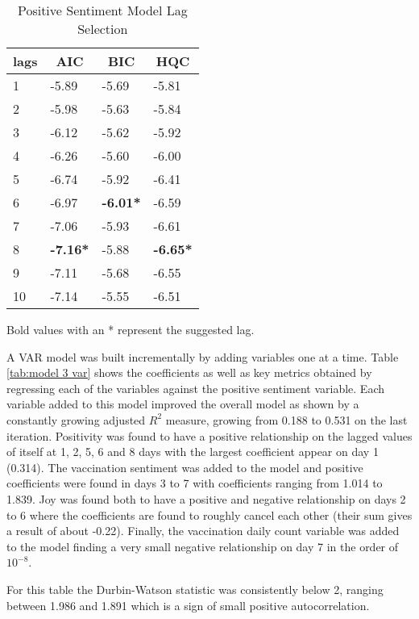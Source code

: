 \begin{table}[H]
\centering
\begin{tabular}{@{}llll@{}}
\toprule
\multicolumn{1}{c}{\textbf{lags}} & \multicolumn{1}{c}{\textbf{AIC}} & \multicolumn{1}{c}{\textbf{BIC}} & \multicolumn{1}{c}{\textbf{HQC}} \\ \midrule
1 & -5.89 & -5.69 & -5.81 \\
2 & -5.98 & -5.63 & -5.84 \\
3 & -6.12 & -5.62 & -5.92 \\
4 & -6.26 & -5.60 & -6.00 \\
5 & -6.74 & -5.92 & -6.41 \\
6 & -6.97 & \textbf{-6.01*} & -6.59 \\
7 & -7.06 & -5.93 & -6.61 \\
8 & \textbf{-7.16*} & -5.88 & \textbf{-6.65*} \\
9 & -7.11 & -5.68 & -6.55 \\
10 & -7.14 & -5.55 & -6.51 \\ \bottomrule
\end{tabular}
\caption{Positive Sentiment Model Lag Selection}
Bold values with an * represent the suggested lag.
\label{tab:model 3 lag}
\end{table}
 
A VAR model was built incrementally by adding variables one at a time. Table \ref{tab:model 3 var} shows the coefficients as well as key metrics obtained by regressing each of the variables against the positive sentiment variable. Each variable added to this model improved the overall model as shown by a constantly growing adjusted $R^2$ measure, growing from 0.188 to 0.531 on the last iteration. Positivity was found to have a positive relationship on the lagged values of itself at 1, 2, 5, 6 and 8 days with the largest coefficient appear on day 1 (0.314). The vaccination sentiment was added to the model and positive coefficients were found in days 3 to 7 with coefficients ranging from 1.014 to 1.839. Joy was found both to have a positive and negative relationship on days 2 to 6 where the coefficients are found to roughly cancel each other (their sum gives a result of about -0.22). Finally, the vaccination daily count variable was added to the model finding a very small negative relationship on day 7 in the order of $10^{-8}$.

For this table the Durbin-Watson statistic was consistently below 2, ranging between 1.986 and 1.891 which is a sign of small positive autocorrelation.

